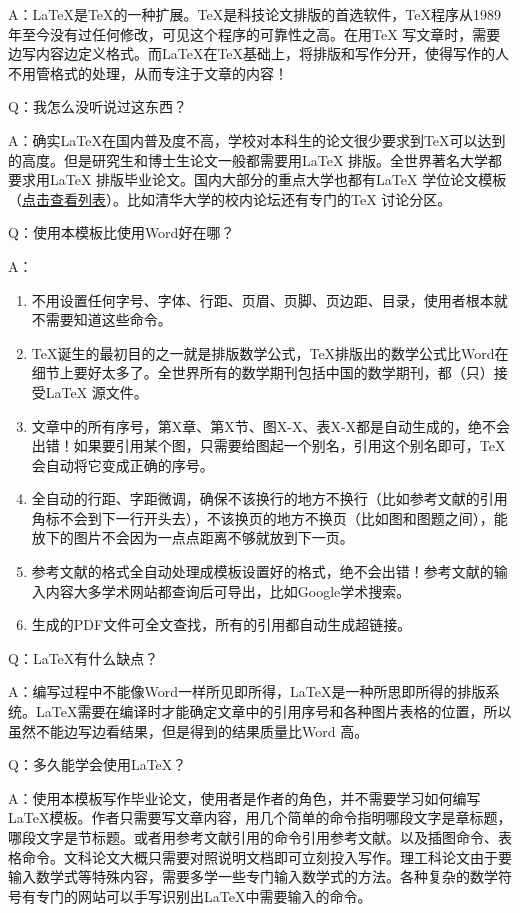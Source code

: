 A：\LaTeX{}是\TeX{}的一种扩展。\TeX{}是科技论文排版的首选软件，\TeX{}程序从1989 年至今没有过任何修改，可见这个程序的可靠性之高。在用\TeX{} 写文章时，需要边写内容边定义格式。而\LaTeX{}在\TeX{}基础上，将排版和写作分开，使得写作的人不用管格式的处理，从而专注于文章的内容！

Q：我怎么没听说过这东西？

A：确实\LaTeX{}在国内普及度不高，学校对本科生的论文很少要求到\TeX{}可以达到的高度。但是研究生和博士生论文一般都需要用\LaTeX{} 排版。全世界著名大学都要求用\LaTeX{} 排版毕业论文。国内大部分的重点大学也都有\LaTeX{} 学位论文模板（\href{http://zzg34b.w3.c361.com/templet/graduateThesis.htm}{点击查看列表}）。比如清华大学的校内论坛还有专门的TeX 讨论分区。

Q：使用本模板比使用Word好在哪？

A：
\begin{enumerate}
\item 不用设置任何字号、字体、行距、页眉、页脚、页边距、目录，使用者根本就不需要知道这些命令。
\item \TeX{}诞生的最初目的之一就是排版数学公式，\TeX{}排版出的数学公式比Word在细节上要好太多了。全世界所有的数学期刊包括中国的数学期刊，都（只）接受\LaTeX{} 源文件。
\item 文章中的所有序号，第X章、第X节、图X-X、表X-X都是自动生成的，绝不会出错！如果要引用某个图，只需要给图起一个别名，引用这个别名即可，TeX 会自动将它变成正确的序号。
\item 全自动的行距、字距微调，确保不该换行的地方不换行（比如参考文献的引用角标不会到下一行开头去），不该换页的地方不换页（比如图和图题之间），能放下的图片不会因为一点点距离不够就放到下一页。
\item 参考文献的格式全自动处理成模板设置好的格式，绝不会出错！参考文献的输入内容大多学术网站都查询后可导出，比如Google学术搜索。
\item 生成的PDF文件可全文查找，所有的引用都自动生成超链接。
\end{enumerate}

Q：\LaTeX{}有什么缺点？

A：编写过程中不能像Word一样所见即所得，\LaTeX{}是一种所思即所得的排版系统。\LaTeX{}需要在编译时才能确定文章中的引用序号和各种图片表格的位置，所以虽然不能边写边看结果，但是得到的结果质量比Word 高。

Q：多久能学会使用\LaTeX{}？

A：使用本模板写作毕业论文，使用者是作者的角色，并不需要学习如何编写\LaTeX{}模板。作者只需要写文章内容，用几个简单的命令指明哪段文字是章标题，哪段文字是节标题。或者用参考文献引用的命令引用参考文献。以及插图命令、表格命令。文科论文大概只需要对照说明文档即可立刻投入写作。理工科论文由于要输入数学式等特殊内容，需要多学一些专门输入数学式的方法。各种复杂的数学符号有专门的网站可以手写识别出LaTeX中需要输入的命令。

